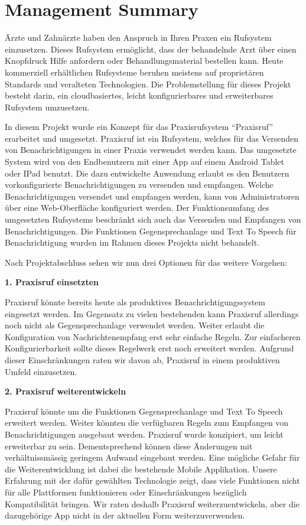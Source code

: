 \section*{Management Summary}

Ärzte und Zahnärzte haben den Anspruch in Ihren Praxen ein Rufsystem einzusetzen.
Dieses Rufsystem ermöglicht, dass der behandelnde Arzt über einen Knopfdruck Hilfe anfordern oder Behandlungsmaterial bestellen kann.
Heute kommerziell erhältlichen Rufsysteme beruhen meistens auf proprietären Standards und veralteten Technologien.\cite{aufgabenstellung}
Die Problemstellung für dieses Projekt besteht darin, ein cloudbasiertes, leicht konfigurierbares und erweiterbares Rufsystem umzusetzen.

In diesem Projekt wurde ein Konzept für das Praxisrufsystem ``Praxisruf'' erarbeitet und umgesetzt.
Praxisruf ist ein Rufsystem, welches für das Versenden von Benachrichtigungen in einer Praxis verwendet werden kann.
Das umgesetzte System wird von den Endbenutzern mit einer App auf einem Android Tablet oder IPad benutzt.
Die dazu entwickelte Anwendung erlaubt es den Benutzern vorkonfigurierte Benachrichtigungen zu versenden und empfangen.
Welche Benachrichtigungen versendet und empfangen werden, kann von Administratoren über eine Web-Oberfläche konfiguriert werden.
Der Funktionsumfang des umgesetzten Rufsystems beschränkt sich auch das Versenden und Empfangen von Benachrichtigungen.
Die Funktionen Gegensprechanlage und Text To Speech für Benachrichtigung wurden im Rahmen dieses Projekts nicht behandelt.

Nach Projektabschluss sehen wir nun drei Optionen für das weitere Vorgehen:


\textbf{1. Praxisruf einsetzten}

Praxisruf könnte bereits heute als produktives Benachrichtigungssystem eingesetzt werden.
Im Gegensatz zu vielen bestehenden kann Praxisruf allerdings noch nicht als Gegensprechanlage verwendet werden.
Weiter erlaubt die Konfiguration von Nachrichtenempfang erst sehr einfache Regeln.
Zur einfacheren Konfigurierbarkeit sollte dieses Regelwerk erst noch erweitert werden.
Aufgrund dieser Einschränkungen raten wir davon ab, Praxisruf in einem produktiven Umfeld einzusetzen.

\textbf{2. Praxisruf weiterentwickeln}

Praxisruf könnte um die Funktionen Gegensprechanlage und Text To Speech erweitert werden.
Weiter könnten die verfügbaren Regeln zum Empfangen von Benachrichtigungen ausgebaut werden.
Praxisruf wurde konzipiert, um leicht erweiterbar zu sein.
Dementsprechend können diese Änderungen mit verhältnissmässig geringem Aufwand eingebaut werden.
Eine mögliche Gefahr für die Weiterentwicklung ist dabei die bestehende Mobile Applikation.
Unsere Erfahrung mit der dafür gewählten Technologie zeigt, dass viele Funktionen nicht für alle Plattformen funktionieren
oder Einschränkungen bezüglich Kompatibilität bringen.
Wir raten deshalb Praxisruf weiterzuentwickeln, aber die dazugehörige App nicht in der aktuellen Form weiterzuverwenden.

